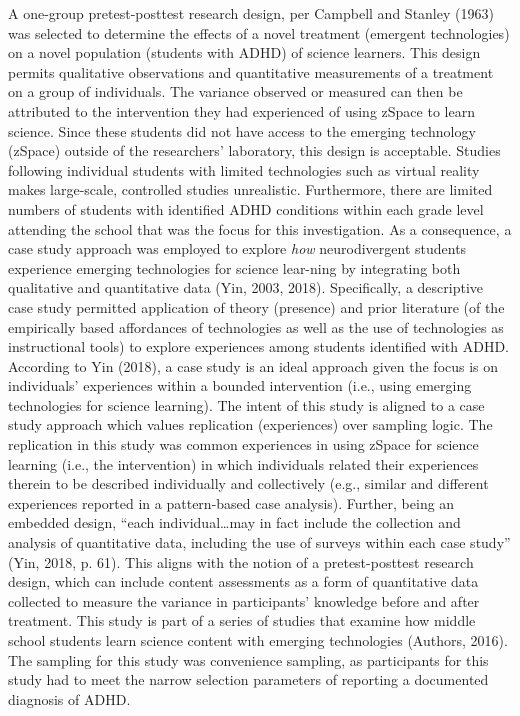\documentclass[11.5pt]{sig-alternate} %
\begin{document}
\begin{large}
A one-group pretest-posttest research design, per Campbell and Stanley (1963) was selected to determine the effects of a novel treatment (emergent technologies) on a novel population (students with ADHD) of science learners. This design permits qualitative observations and quantitative measurements of a treatment on a group of individuals. The variance observed or measured can then be attributed to the intervention they had experienced of using zSpace to learn science. Since these students did not have access to the emerging technology (zSpace) outside of the researchers’ laboratory, this design is acceptable. Studies following individual students with limited technologies such as virtual reality makes large-scale, controlled studies unrealistic. Furthermore, there are limited numbers of students with identified ADHD conditions within each grade level attending the school that was the focus for this investigation. As a consequence, a case study approach was employed to explore \textit{how} neurodivergent students experience emerging technologies for science lear-ning by integrating both qualitative and quantitative data (Yin, 2003, 2018). Specifically, a descriptive case study permitted application of theory (presence) and prior literature (of the empirically based affordances of technologies as well as the use of technologies as instructional tools) to explore experiences among students identified with ADHD. According to Yin (2018), a case study is an ideal approach given the focus is on individuals’ experiences within a bounded intervention (i.e., using emerging technologies for science learning). The intent of this study is aligned to a case study approach which values replication (experiences) over sampling logic. The replication in this study was common experiences in using zSpace for science learning (i.e., the intervention) in which individuals related their experiences therein to be described individually and collectively (e.g., similar and different experiences reported in a pattern-based case analysis). Further, being an embedded design, “each individual…may in fact include the collection and analysis of quantitative data, including the use of surveys within each case study” (Yin, 2018, p. 61). This aligns with the notion of a pretest-posttest research design, which can include content assessments as a form of quantitative data collected to measure the variance in participants’ knowledge before and after treatment. This study is part of a series of studies that examine how middle school students learn science content with emerging technologies (Authors, 2016). The sampling for this study was convenience sampling, as participants for this study had to meet the narrow selection parameters of reporting a documented diagnosis of ADHD. 


\end{large}
\end{document}
